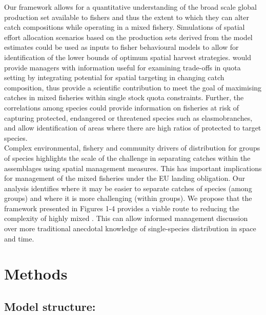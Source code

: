 \documentclass[fleqn,10pt]{wlscirep}
\begin{document}
\begin{linenumbers}
Our framework allows for a quantitative understanding of the broad scale global
production set available to fishers\cite{Reimer2017} and thus the extent to
which they can alter catch compositions while operating in a mixed fishery.
Simulations of spatial effort allocation scenarios based on the production sets
derived from the model estimates could be used as inputs to fisher behavioural
models to allow for identification of the lower bounds of optimum spatial
harvest strategies.  would provide managers with
information useful for examining trade-offs in quota setting by integrating
potential for spatial targeting in changing catch composition, thus provide a
scientific contribution to  meet the
goal of maximising catches in mixed fisheries within single stock quota
constraints\cite{Ulrich2016}. Further, the correlations among species could
provide information on fisheries at risk of capturing protected, endangered or
threatened species such as elasmobranches, and allow identification of areas
where there are high ratios of protected to target species.\\


Complex environmental, fishery and community drivers of distribution for groups
of species highlights the scale of the challenge in separating catches within
the assemblages using spatial management measures. This has important
implications for management of the mixed fisheries under the EU landing
obligation. Our analysis identifies where it may be easier to separate catches
of species (among groups) and where it is more challenging (within groups). We
propose that the  framework presented in
Figures 1-4 provides a viable route to reducing the complexity of highly mixed
.  This can allow informed management
discussion over more traditional anecdotal knowledge of single-species
distribution in space and time.\\


\section*{Methods\\}

\subsection*{Model structure:\\} 


\end{linenumbers}
\end{document}
